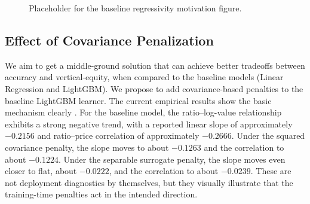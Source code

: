 \documentclass[12pt, draft]{article}
\theoremstyle{plain}
\theoremstyle{definition}
\newcommand{\1}{\mathbf{1}}
\begin{document}
\begin{table}[!ht]
\centering
\caption{Baseline comparison on the \textit{assessment} set (2024). Lower is better for MAE, COD, and COV. For PRD, values closer to one are preferred; for VEI and PRB, values closer to zero are preferred.}
\label{tab:baseline_models_2}
\end{table}




\begin{figure}[t]
\centering
{}
\caption{Placeholder for the baseline regressivity motivation figure.}
\label{fig:baseline_regressivity_placeholder}
\end{figure}

\subsection{Effect of Covariance Penalization}

We aim to get a middle-ground solution that can achieve better tradeoffs between accuracy and vertical-equity, when compared to the baseline models (Linear Regression and LightGBM). We propose to add covariance-based penalties to the baseline LightGBM learner. The current empirical results show the basic mechanism clearly . For the baseline model, the ratio--log-value relationship exhibits a strong negative trend, with a reported linear slope of approximately \(-0.2156\) and ratio--price correlation of approximately \(-0.2666\). Under the squared covariance penalty, the slope moves to about \(-0.1263\) and the correlation to about \(-0.1224\). Under the separable surrogate penalty, the slope moves even closer to flat, about \(-0.0222\), and the correlation to about \(-0.0239\). These are not deployment diagnostics by themselves, but they visually illustrate that the training-time penalties act in the intended direction.
\end{document}
